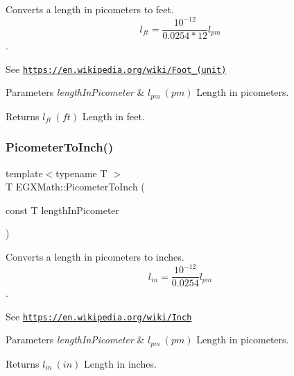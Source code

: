Converts a length in picometers to feet. \[ l_{ft}= \frac{10^{-12}}{0.0254 * 12} l_{pm} \]. 

See \href{https://en.wikipedia.org/wiki/Foot_(unit)}{\tt https\+://en.\+wikipedia.\+org/wiki/\+Foot\+\_\+(unit)} 
\begin{DoxyParams}{Parameters}
{\em length\+In\+Picometer} & $ l_{pm}\ (pm)$ Length in picometers. \\
\hline
\end{DoxyParams}
\begin{DoxyReturn}{Returns}
$ l_{ft}\ (ft)$ Length in feet. 
\end{DoxyReturn}
\mbox{\label{group___e_g_x_math-_conversions-_length_conversions-_s_i-_picometer-_imperial_ga163afd72563986ed456466be07efd3cb}} 
\subsubsection{\texorpdfstring{Picometer\+To\+Inch()}{PicometerToInch()}}
{\footnotesize\ttfamily template$<$typename T $>$ \\
T E\+G\+X\+Math\+::\+Picometer\+To\+Inch (\begin{DoxyParamCaption}\item[{const T}]{length\+In\+Picometer }\end{DoxyParamCaption})}



Converts a length in picometers to inches. \[ l_{in}= \frac{10^{-12}}{0.0254} l_{pm} \]. 

See \href{https://en.wikipedia.org/wiki/Inch}{\tt https\+://en.\+wikipedia.\+org/wiki/\+Inch} 
\begin{DoxyParams}{Parameters}
{\em length\+In\+Picometer} & $ l_{pm}\ (pm)$ Length in picometers. \\
\hline
\end{DoxyParams}
\begin{DoxyReturn}{Returns}
$ l_{in}\ (in)$ Length in inches. 
\end{DoxyReturn}
\mbox{\label{group___e_g_x_math-_conversions-_length_conversions-_s_i-_picometer-_imperial_ga727778c82b4049ff45091f492993150d}} 
